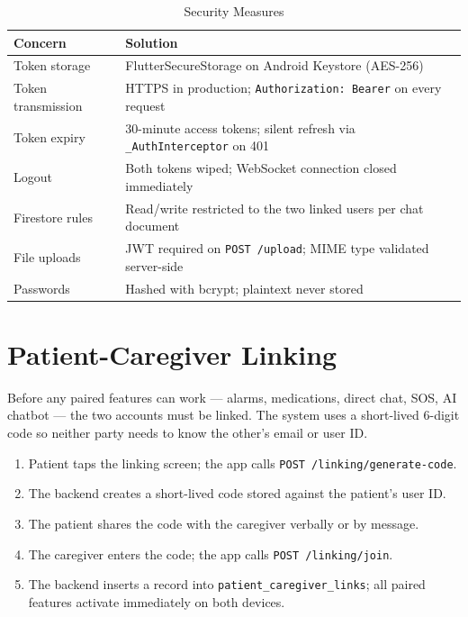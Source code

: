 \documentclass[12pt,a4paper]{report}
\begin{document}
\begin{table}[H]
\centering
\caption{Security Measures}
\label{tab:security}
\begin{tabularx}{\textwidth}{@{}lX@{}}
\toprule
\textbf{Concern}    & \textbf{Solution} \\
\midrule
Token storage       & FlutterSecureStorage on Android Keystore (AES-256) \\
Token transmission  & HTTPS in production; \texttt{Authorization: Bearer} on every request \\
Token expiry        & 30-minute access tokens; silent refresh via \texttt{\_AuthInterceptor} on 401 \\
Logout              & Both tokens wiped; WebSocket connection closed immediately \\
Firestore rules     & Read/write restricted to the two linked users per chat document \\
File uploads        & JWT required on \texttt{POST /upload}; MIME type validated server-side \\
Passwords           & Hashed with bcrypt; plaintext never stored \\
\bottomrule
\end{tabularx}
\end{table}

\section{Patient-Caregiver Linking}

Before any paired features can work — alarms, medications, direct chat, SOS, AI chatbot — the two accounts must be linked. The system uses a short-lived 6-digit code so neither party needs to know the other's email or user ID.

\begin{enumerate}
  \item Patient taps the linking screen; the app calls \texttt{POST /linking/generate-code}.
  \item The backend creates a short-lived code stored against the patient's user ID.
  \item The patient shares the code with the caregiver verbally or by message.
  \item The caregiver enters the code; the app calls \texttt{POST /linking/join}.
  \item The backend inserts a record into \texttt{patient\_caregiver\_links}; all paired features activate immediately on both devices.
\end{enumerate}
\end{document}
